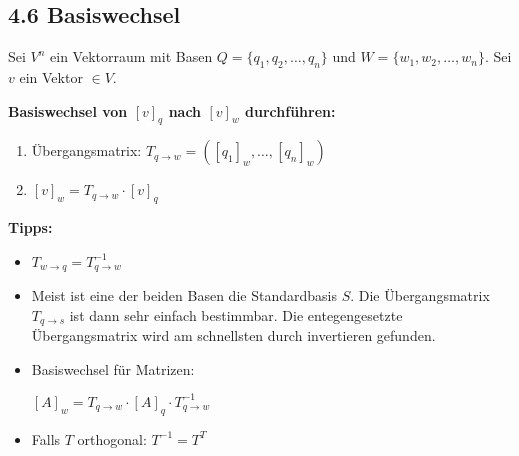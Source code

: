 \subsection{4.6 Basiswechsel}{
\vskip1pt

Sei $V^n$ ein Vektorraum mit Basen $Q = \{q_1, q_2, \hdots, q_n\}$ und $W = \{w_1, w_2, \hdots, w_n\}$. Sei $v$ ein Vektor $\in V$.
\par
\vskip8pt

\textbf{Basiswechsel von $[v]_q$ nach $[v]_w$ durchführen:}
\begin{enumerate}[label=\protect\circled{\arabic*}]
\item Übergangsmatrix: $T_{q \rightarrow w} = ([q_1]_w, \hdots, [q_n]_w)$
\item $[v]_w = T_{q \rightarrow w}\cdot[v]_q$
\end{enumerate}
\vskip6pt

\textbf{Tipps:}
\begin{itemize}[leftmargin=0.29cm, itemsep=0.5pt]
\item $T_{w \rightarrow q} = T_{q \rightarrow w}^{-1}$
\item Meist ist eine der beiden Basen die Standardbasis $S$. Die Übergangsmatrix $T_{q \rightarrow s}$ ist dann sehr einfach bestimmbar. Die entegengesetzte Übergangsmatrix wird am schnellsten durch invertieren gefunden.
\item Basiswechsel für Matrizen: \par $[A]_w = T_{q \rightarrow w}\cdot [A]_q \cdot T_{q \rightarrow w}^{-1}$
\item Falls $T$ orthogonal: $T^{-1} = T^T$
\end{itemize}

\vspace{-3pt}
}
\WhiteSpace